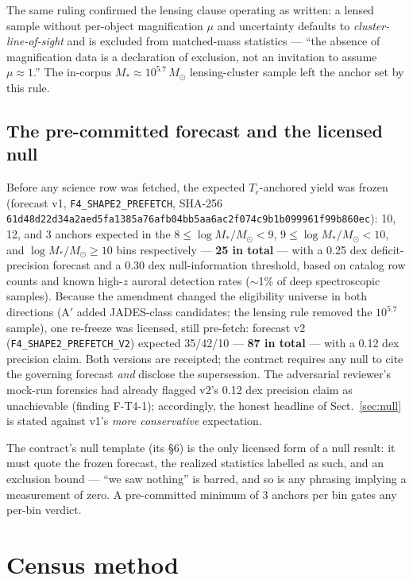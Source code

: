 \documentclass[twocolumn]{aastex702}
\newcommand{\te}{$T_e$}
\newcommand{\logm}{\log M_*/M_\odot}
\begin{document}
The same ruling confirmed the lensing clause operating as written: a lensed sample
without per-object magnification $\mu$ and uncertainty defaults to
\emph{cluster-line-of-sight} and is excluded from matched-mass statistics — ``the
absence of magnification data is a declaration of exclusion, not an invitation to
assume $\mu\approx1$.'' The in-corpus $M_*\approx10^{5.7}\,M_\odot$ lensing-cluster
sample left the anchor set by this rule.

\subsection{The pre-committed forecast and the licensed null}\label{sec:forecast}

Before any science row was fetched, the expected \te{}-anchored yield was frozen
(forecast v1, \texttt{F4\_SHAPE2\_PREFETCH}, SHA-256
\texttt{61d48d22d34a2aed5fa1385a76afb04bb5aa6ac2f074c9b1b099961f99b860ec}): 10, 12,
and 3 anchors expected in the $8\leq\logm<9$, $9\leq\logm<10$, and $\logm\geq10$
bins respectively — \textbf{25 in total} — with a 0.25 dex deficit-precision
forecast and a 0.30 dex null-information threshold, based on catalog row counts and
known high-$z$ auroral detection rates ($\sim$1\% of deep spectroscopic samples).
Because the amendment changed the eligibility universe in both directions
(A$'$ added JADES-class candidates; the lensing rule removed the $10^{5.7}$ sample),
one re-freeze was licensed, still pre-fetch: forecast v2
(\texttt{F4\_SHAPE2\_PREFETCH\_V2}) expected 35/42/10 — \textbf{87 in total} — with
a 0.12 dex precision claim. Both versions are receipted; the contract requires any
null to cite the governing forecast \emph{and} disclose the supersession. The
adversarial reviewer's mock-run forensics had already flagged v2's 0.12 dex
precision claim as unachievable (finding F-T4-1); accordingly, the honest headline
of Sect.~\ref{sec:null} is stated against v1's \emph{more conservative} expectation.

The contract's null template (its \S6) is the only licensed form of a null result:
it must quote the frozen forecast, the realized statistics labelled as such, and an
exclusion bound — ``we saw nothing'' is barred, and so is any phrasing implying a
measurement of zero. A pre-committed minimum of 3 anchors per bin gates any per-bin
verdict.

\section{Census method}\label{sec:method}
\end{document}
